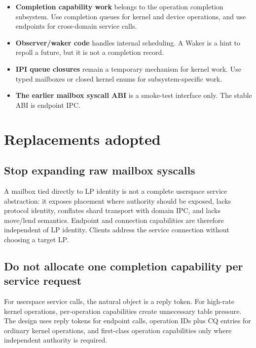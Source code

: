 \begin{itemize}
    \item \textbf{Completion capability work} belongs to the operation
        completion subsystem. Use completion
        queues for kernel and device operations, and use endpoints for cross-domain
        service calls.

    \item \textbf{Observer/waker code} handles internal scheduling. A Waker is a hint to
        repoll a future, but it is not a completion record.

    \item \textbf{IPI queue closures} remain a temporary mechanism for kernel
        work. Use typed mailboxes or
        closed kernel enums for subsystem-specific work.

    \item \textbf{The earlier mailbox syscall ABI} is a smoke-test interface
        only. The stable ABI is endpoint IPC.
\end{itemize}

\section{Replacements adopted}

\subsection{Stop expanding raw mailbox syscalls}

A mailbox tied directly to LP identity is not a complete userspace service
abstraction: it exposes placement where authority should be exposed, lacks
protocol identity, conflates shard transport with domain IPC, and lacks
move/lend semantics. Endpoint and connection capabilities are therefore
independent of LP identity. Clients address the service connection without
choosing a target LP.

\subsection{Do not allocate one completion capability per service request}

For userspace service calls, the natural object is a reply token. For
high-rate kernel operations, per-operation capabilities create unnecessary
table pressure. The design uses reply tokens for endpoint calls,
operation IDs plus CQ entries for ordinary kernel operations, and first-class
operation capabilities only where independent authority is required.

